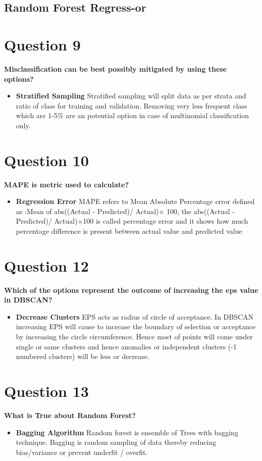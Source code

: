 \documentclass[10pt,letterpaper]{article}
\begin{document}
\subsection{Random Forest Regress-or}

\section{Question 9}
\textbf{Misclassification can be best possibly mitigated by using these options?}
\begin{itemize}
\item \textbf{Stratified Sampling} Stratified sampling will split data as per strata and ratio of class for training and validation. Removing very less frequent class which are 1-5\% are an potential option in case of multinomial classification only.
\end{itemize}

\section{Question 10}
\textbf{MAPE is metric used to calculate?}
\begin{itemize}
\item \textbf{Regression Error} MAPE refers to Mean Absolute Percentage error defined as :Mean of abs((Actual - Predicted)/ Actual)$\times$ 100, the abs((Actual - Predicted)/ Actual)$\times$100 is called percentage error and it shows how much percentage difference is present between actual value and predicted value
\end{itemize}

\section{Question 12}
\textbf{Which of the options represent the outcome of increasing the eps value in DBSCAN?}
\begin{itemize}
\item \textbf{Decrease Clusters} EPS acts as radius of circle of acceptance. In DBSCAN increasing EPS will cause to increase the boundary of selection or acceptance by increasing the circle circumference.  Hence most of points will come under single or same clusters and hence anomalies or independent clusters (-1 numbered clusters) will be less or decrease.
\end{itemize}


\section{Question 13}
\textbf{What is True about Random Forest?}
\begin{itemize}
\item \textbf{Bagging Algorithm} Random forest is ensemble of Trees with bagging technique. Bagging is random sampling of data thereby reducing bias/variance  or prevent underfit / overfit.
\end{itemize}
\end{document}
